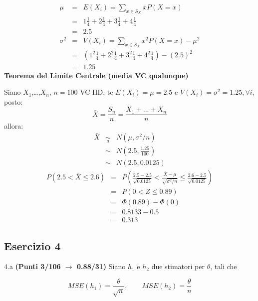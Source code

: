 \documentclass[
  11pt,
]{book}
\theoremstyle{mytheoremstyle}
\theoremstyle{mydefstyle}
\newenvironment{sol}
  {
  \begin{tcolorbox}[enhanced,breakable,arc=0.1mm,boxrule=1pt,colback=white,colframe=iblue,
  title=\bf \fontfamily{lmss}\selectfont \hspace{.5 cm} Soluzione,drop fuzzy shadow]

}{
\end{tcolorbox}
  }
\begin{document}
\begin{sol}
\begin{eqnarray*} \mu &=& E(X_i) = \sum_{x\in S_X}x P(X=x)\\ 
 &=&  1  \frac { 1 }{ 4 }+ 2  \frac { 1 }{ 4 }+ 3  \frac { 1 }{ 4 }+ 4  \frac { 1 }{ 4 } \\ 
            &=& 2.5 \\ 
 \sigma^2 &=& V(X_i) = \sum_{x\in S_X}x^2 P(X=x)-\mu^2\\ 
 &=&\left(  1  ^2\frac { 1 }{ 4 }+ 2  ^2\frac { 1 }{ 4 }+ 3  ^2\frac { 1 }{ 4 }+ 4  ^2\frac { 1 }{ 4 } \right)-( 2.5 )^2\\ 
            &=& 1.25 
\end{eqnarray*}
\textbf{Teorema del Limite Centrale (media VC qualunque)}

Siano \(X_1\),\ldots,\(X_n\), \(n=100\) VC IID, tc \(E(X_i)=\mu=2.5\) e \(V(X_i)=\sigma^2=1.25,\forall i\), posto:
\[
      \bar X=\frac{S_n}n =\frac{X_1 + ... + X_n}n
      \]
allora:\begin{eqnarray*}
  \bar X & \mathop{\sim}\limits_{a}& N(\mu,\sigma^2/n) \\
     &\sim & N\left(2.5,\frac{1.25}{100}\right) \\
     &\sim & N(2.5,0.0125)
  \end{eqnarray*}\begin{eqnarray*}
   P( 2.5 < \bar X \leq  2.6 ) &=& P\left( \frac { 2.5  -  2.5 }{\sqrt{ 0.0125 }} < \frac { \bar X  -  \mu }{ \sqrt{\sigma^2/n} } \leq \frac { 2.6  -  2.5 }{\sqrt{ 0.0125 }}\right)  \\
              &=& P\left(  0  < Z \leq  0.89 \right) \\
              &=& \Phi( 0.89 )-\Phi( 0 )\\
              &=&  0.8133 - 0.5 \\ 
              &=&  0.313 
   \end{eqnarray*}

\end{sol}

\subsection{Esercizio 4}\label{esercizio-4-16}

4.a \textbf{(Punti 3/106 \(\rightarrow\) 0.88/31)} Siano \(h_1\) e \(h_2\) due stimatori per \(\theta\), tali che

\[
  MSE(h_1) =  \frac{\theta}{\sqrt{n}}, \qquad  MSE(h_2) =  \frac{\theta}{n}
\]
\end{document}
